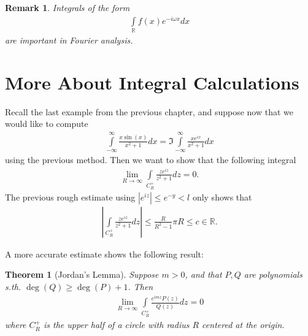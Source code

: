 \documentclass[12pt, a4paper]{article}
\theoremstyle{plain}
\newtheorem{thm}{Theorem} %
\newtheorem{rem}{Remark}
\theoremstyle{definition}
\begin{document}
			\begin{rem}
				Integrals of the form
				\begin{align*}
					\int\limits_{\mathbb{R}}f(x)e^{-i\omega x}dx
				\end{align*}
				are important in Fourier analysis.
			\end{rem}
	\section{More About Integral Calculations} %
	\label{sec:more_about_integral_calculations}
		Recall the last example from the previous chapter, and suppose now that we would like to compute
		\begin{align*}
			\int\limits_{-\infty}^{\infty}\frac{x\sin(x)}{x^2+1}dx = 
			\Im \int\limits_{-\infty}^{\infty}\frac{xe^{ix}}{x^2+1}dx
		\end{align*}
		using the previous method. Then we want to show that the following integral
		\begin{align*}
			\lim\limits_{R\to\infty}\int\limits_{C_R^+}\frac{ze^{iz}}{z^2+1}dz = 0.
		\end{align*}
		The previous rough estimate using $|e^{iz}|\le e^{-y}<l$ only shows that
		\begin{align*}
			\left|\int\limits_{C_R^+}\frac{ze^{iz}}{z^2+1}dz \right|\le \frac{R}{R^2-1}\pi R \le c\in \mathbb{R}.
		\end{align*}

		A more accurate estimate shows the following result:\\

		\begin{thm}[Jordan's Lemma]
			Suppose $m>0$, and that $P,Q$ are polynomials s.th. $\deg(Q)\ge \deg(P)+1$. Then
			\begin{align*}
				\lim\limits_{R\to\infty}\int\limits_{C_R^+}\frac{e^{imz}P(z)}{Q(z)}dz = 0
			\end{align*}
			where $C_R^+$ is the upper half of a circle with radius $R$ centered at the origin.
		\end{thm}
\end{document}
